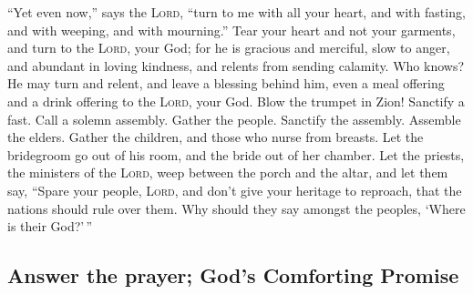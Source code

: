  ``Yet even now,'' says the \textsc{Lord}, ``turn to me
with all your heart, and with fasting, and with weeping, and with
mourning.''  Tear your heart and not your garments, and
turn to the \textsc{Lord}, your God; for he is gracious and merciful,
slow to anger, and abundant in loving kindness, and relents from sending
calamity.  Who knows? He may turn and relent, and leave a
blessing behind him, even a meal offering and a drink offering to the
\textsc{Lord}, your God.  Blow the trumpet in Zion!
Sanctify a fast. Call a solemn assembly.  Gather the
people. Sanctify the assembly. Assemble the elders. Gather the children,
and those who nurse from breasts. Let the bridegroom go out of his room,
and the bride out of her chamber.  Let the priests, the
ministers of the \textsc{Lord}, weep between the porch and the altar,
and let them say, ``Spare your people, \textsc{Lord}, and don't give
your heritage to reproach, that the nations should rule over them. Why
should they say amongst the peoples, `Where is their God?'\,''

\hypertarget{answer-the-prayer-gods-comforting-promise}{%
\subsection{Answer the prayer; God's Comforting
Promise}\label{answer-the-prayer-gods-comforting-promise}}

